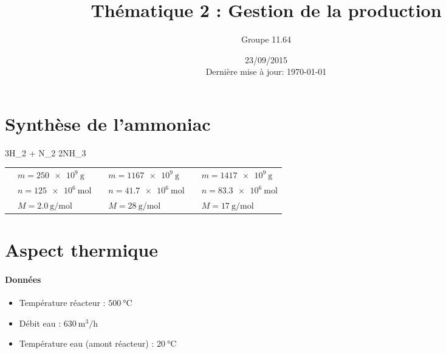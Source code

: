 \documentclass[a4paper,french]{article}
\title{Thématique 2 : Gestion de la production}
\author{Groupe 11.64}
\date{23/09/2015\\Dernière mise à jour: \today}
\begin{document}
	\maketitle	
	\section{Synthèse de l'ammoniac}
		\begin{chemmath}
			3H_2 + N_2 \longrightarrow 2NH_3	
		\end{chemmath}
		\begin{table}[h]
			\centering
			\renewcommand{\arraystretch}{2}
			\begin{tabular}{|cl|cl|cl|}\hline
				\chemform{3H_2} & $m = \SI{250e9}{\gram}$ & \chemform{N_2} & $m = \SI{1167e9}{\gram}$ & \chemform{2NH_3} & $m = \SI{1417e9}{\gram}$ \\
				& $n = \SI{125e6}{\mol}$ & & $n = \SI{41.7e6}{\mol}$ & & $n = \SI{83.3e6}{\mol}$ \\
				& $M = \SI{2.0}{\gram\per\mol}$ & & $M = \SI{28}{\gram\per\mol}$ & & $M = \SI{17}{\gram\per\mol}$ \\\hline
			\end{tabular}
		\end{table}
	\section{Aspect thermique}
		\paragraph*{Données}
			\begin{itemize}
				\item Température réacteur : $\SI{500}{\celsius}$
				\item Débit eau : $\SI{630}{\meter^3\per\hour}$
				\item Température eau (amont réacteur) : $\SI{20}{\celsius}$
			\end{itemize}	
\end{document}
